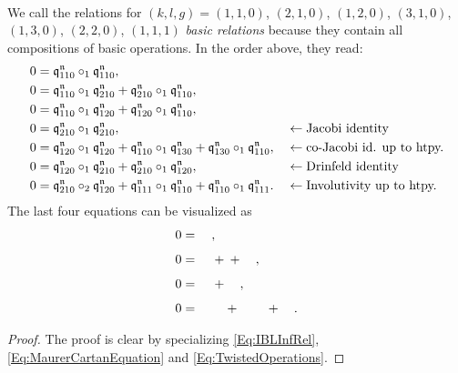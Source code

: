 \documentclass[\MainFolder/Text.tex]{subfiles}
\begin{document}
\begin{Proposition}
\begin{equation}
\begin{aligned}
\end{aligned}
\end{equation}
We call the relations for $(k,l,g) = (1,1,0)$, $(2,1,0)$, $(1,2,0)$, $(3,1,0)$, $(1,3,0)$, $(2,2,0)$, $(1,1,1)$ \emph{basic relations} because they contain all compositions of basic operations. In the order above, they read:
\[\begin{aligned} 
 0 & =\mathfrak{q}^{\mathfrak{n}}_{110} \circ_1 \mathfrak{q}^{\mathfrak{n}}_{110}, && \\
0 &=\mathfrak{q}^{\mathfrak{n}}_{110}\circ_1\mathfrak{q}^{\mathfrak{n}}_{210} + \mathfrak{q}^{\mathfrak{n}}_{210}\circ_1 \mathfrak{q}^{\mathfrak{n}}_{110}, && \\
0 &= \mathfrak{q}^{\mathfrak{n}}_{110}\circ_1 \mathfrak{q}^{\mathfrak{n}}_{120} + \mathfrak{q}^{\mathfrak{n}}_{120}\circ_1 \mathfrak{q}^{\mathfrak{n}}_{110}, && \\
0 &= \mathfrak{q}^{\mathfrak{n}}_{210} \circ_1 \mathfrak{q}^{\mathfrak{n}}_{210}, && \leftarrow\text{Jacobi identity} \\
0 &=\mathfrak{q}^{\mathfrak{n}}_{120} \circ_1 \mathfrak{q}^{\mathfrak{n}}_{120} + \mathfrak{q}^{\mathfrak{n}}_{110}\circ_1 \mathfrak{q}^{\mathfrak{n}}_{130} + \mathfrak{q}^{\mathfrak{n}}_{130}\circ_1 \mathfrak{q}^{\mathfrak{n}}_{110}, && \leftarrow\text{co-Jacobi id. up to htpy.} \\
0 & = \mathfrak{q}^{\mathfrak{n}}_{120}\circ_1 \mathfrak{q}^{\mathfrak{n}}_{210} + \mathfrak{q}^{\mathfrak{n}}_{210}\circ_1 \mathfrak{q}^{\mathfrak{n}}_{120}, && \leftarrow\text{Drinfeld identity} \\
0 & = \mathfrak{q}^{\mathfrak{n}}_{210}\circ_2 \mathfrak{q}^{\mathfrak{n}}_{120} + \mathfrak{q}^{\mathfrak{n}}_{111}\circ_1 \mathfrak{q}^{\mathfrak{n}}_{110} + \mathfrak{q}^{\mathfrak{n}}_{110}\circ_1 \mathfrak{q}^{\mathfrak{n}}_{111}. && \leftarrow\text{Involutivity up to htpy.}
\end{aligned}\]
The last four equations can be visualized as
{ \begingroup \allowdisplaybreaks
\def\dist{0.25} %
  \def\rad{0.4} %
  \def\ecc{0.1} %
  \def\hght{1} %
  \def\dif{1.1} %
  \def\difbig{1.5*\dif} %
  \def\radO{\rad} %
  \def\eccO{\ecc} %
  \def\hghtO{2*\hght+\dist} %
  \def\difO{\dif} %
  \def\gencanc{0.05} %
  \def\genecc{20} %
  \def\genrad{0.3} %
\begin{align*}
0 & =\quad\vcenterline{}, \\[1ex] 
0&=\quad \vcenterline{}+
\vcenterline{}
+\quad\vcenterline{}, \\[1ex] 
0&=\quad \vcenterline{}+\quad\vcenterline{},\\[1ex]
0& =\quad \vcenterline{}\quad+\quad\vcenterline{}\quad+\quad\vcenterline{}.
\end{align*}
\endgroup}
\end{Proposition}
\begin{proof}
The proof is clear by specializing \eqref{Eq:IBLInfRel}, \eqref{Eq:MaurerCartanEquation} and \eqref{Eq:TwistedOperations}.
\end{proof}
\end{document}
